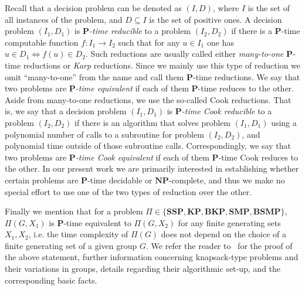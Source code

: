 \documentclass[10pt]{amsart}
\theoremstyle{definition}
\def\P{{\mathbf{P}}}
\def\NP{{\mathbf{NP}}}
\def\SSP{{\mathbf{SSP}}}
\def\SMP{{\mathbf{SMP}}}
\def\BSMP{{\mathbf{BSMP}}}
\def\BKP{{\mathbf{BKP}}}
\def\KP{{\mathbf{KP}}}
\begin{document}


\medskip
Recall that a decision problem can be denoted as $(I,D)$, where $I$ is the set of all instances of the problem, and $D\subseteq I$ is the set of positive ones. A decision problem $(I_1,D_1)$ is  {\em $\P$-time  reducible}
to  a problem $(I_2,D_2)$ if there is a $\P$-time computable function
$f:I_1  \to I_2$  such that for any $u \in I_1$ one has $u \in D_1 \Longleftrightarrow f(u) \in D_2$.
Such reductions are usually called either {\em many-to-one} $\P$-time reductions or {\em Karp} reductions.
Since we mainly use this type of reduction we omit ``many-to-one'' from the name and call them $\P$-time reductions. We say that two problems are {\em $\P$-time equivalent} if each of them $\P$-time reduces to the other. Aside from many-to-one reductions, we use the so-called Cook reductions. That is, we say that a decision problem $(I_1,D_1)$ is  {\em $\P$-time Cook  reducible} to  a problem $(I_2,D_2)$ if there is an algorithm that solves problem $(I_1,D_1)$ using a polynomial number of calls to a subroutine for problem $(I_2,D_2)$, and polynomial time outside of those subroutine calls. Correspondingly, we say that two problems are {\em $\P$-time Cook equivalent} if each of them $\P$-time Cook reduces to the other. In our present work we are primarily interested in establishing whether certain problems are $\P$-time decidable or $\NP$-complete, and thus we make no special effort to use one of the two types of reduction over the other.

Finally we mention that for a problem $\Pi\in \{\SSP, \KP, \BKP, \SMP, \BSMP\}$, $\Pi(G,X_1)$ is $\P$-time equivalent to $\Pi(G,X_2)$ for any finite generating sets $X_1,X_2$, i.e. the time complexity of $\Pi(G)$ does not depend on the choice of a finite generating set of a given group $G$.
We refer the reader to~\cite{Miasnikov-Nikolaev-Ushakov:2014a} for the proof of the above statement, further information concerning knapsack-type problems and their variations in groups, details regarding their algorithmic set-up, and the corresponding basic facts.
\end{document}
